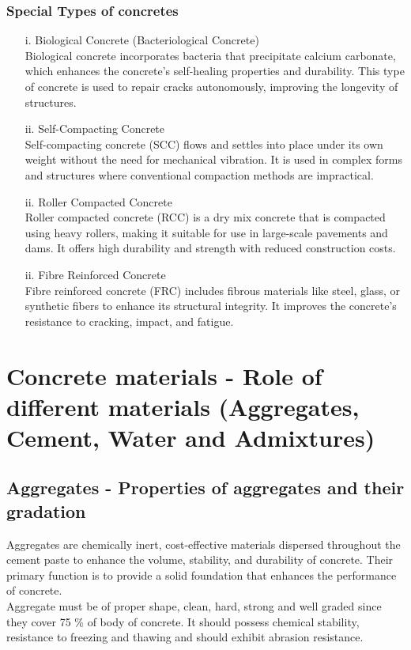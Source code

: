 \documentclass[a4paper,11pt]{book}
\begin{document}
\subsubsection{Special Types of concretes}
\begin{enumerate}
    \item[i.] Biological Concrete (Bacteriological Concrete)\\
    Biological concrete incorporates bacteria that precipitate calcium carbonate, which enhances the concrete's self-healing properties and durability. This type of concrete is used to repair cracks autonomously, improving the longevity of structures.
    \item[ii.] Self-Compacting Concrete\\
    Self-compacting concrete (SCC) flows and settles into place under its own weight without the need for mechanical vibration. It is used in complex forms and structures where conventional compaction methods are impractical.
    \item[ii.] Roller Compacted Concrete\\
    Roller compacted concrete (RCC) is a dry mix concrete that is compacted using heavy rollers, making it suitable for use in large-scale pavements and dams. It offers high durability and strength with reduced construction costs.
    \item[ii.] Fibre Reinforced Concrete\\
    Fibre reinforced concrete (FRC) includes fibrous materials like steel, glass, or synthetic fibers to enhance its structural integrity. It improves the concrete's resistance to cracking, impact, and fatigue.
\end{enumerate}
\section{ Concrete materials - Role of different materials (Aggregates, Cement, Water and Admixtures)}
\subsection{Aggregates - Properties of aggregates and their
gradation}
Aggregates are chemically inert, cost-effective materials dispersed throughout the cement paste to enhance the volume, stability, and durability of concrete. Their primary function is to provide a solid foundation that enhances the performance of concrete.
\\ Aggregate must be of proper shape, clean, hard, strong and well graded since they cover 75 \% of body of concrete. It should possess chemical stability, resistance to freezing and thawing and
should exhibit abrasion resistance.
\end{document}
